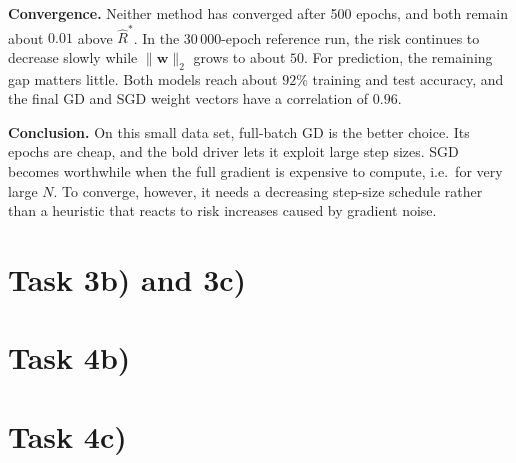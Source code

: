 \documentclass[a4paper,oneside,bibliography=totoc]{scrartcl}
\begin{document}
\begin{answer}[19.5cm]
  \textbf{Convergence.} Neither method has converged after 500 epochs, and both remain about $0.01$
  above $\hat R^*$. In the 30\,000-epoch reference run, the risk continues to decrease slowly while
  $\lVert\mathbf w\rVert_2$ grows to about $50$. For prediction, the remaining gap matters little. Both
  models reach about $92\%$ training and test accuracy, and the final GD and SGD weight vectors have a
  correlation of $0.96$.

  \textbf{Conclusion.} On this small data set, full-batch GD is the better choice. Its epochs are cheap,
  and the bold driver lets it exploit large step sizes. SGD becomes worthwhile when the full gradient is
  expensive to compute, i.e.\ for very large $N$. To converge, however, it needs a decreasing step-size
  schedule rather than a heuristic that reacts to risk increases caused by gradient noise.
\end{answer}


\section*{Task 3b) and 3c)}
\begin{answer}[19.5cm]
\end{answer}

\section*{Task 4b)}
\begin{answer}[19.5cm]
\end{answer}


\section*{Task 4c)}
\begin{answer}[19.5cm]
\end{answer}

\newpage

\end{document}
